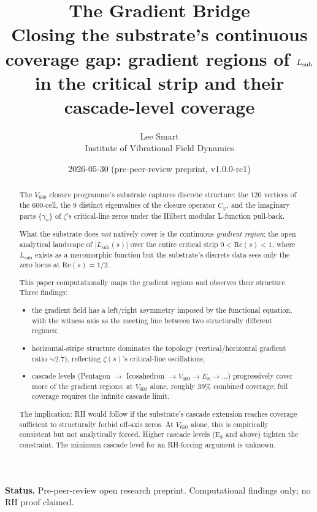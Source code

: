 \documentclass[11pt,a4paper]{article}
\title{\textbf{The Gradient Bridge}\\[0.4em]
\large Closing the substrate's continuous coverage gap:
gradient regions of $\Lsub$ in the critical strip and their
cascade-level coverage}
\author{Lee Smart\\
\small Institute of Vibrational Field Dynamics}
\date{2026-05-30 \quad (pre-peer-review preprint, v1.0.0-rc1)}
\newcommand{\Vsix}{V_{600}}
\newcommand{\Cphi}{C_\varphi}
\newcommand{\Lsub}{L_{\mathrm{sub}}}
\begin{document}
\maketitle

\begin{abstract}
\noindent
The $\Vsix$ closure programme's substrate captures discrete
structure: the $120$ vertices of the $600$-cell, the $9$ distinct
eigenvalues of the closure operator $\Cphi$, and the imaginary
parts $\{\gamma_n\}$ of $\zeta$'s critical-line zeros under the
Hilbert modular L-function pull-back.

What the substrate does \emph{not} natively cover is the
continuous \emph{gradient region}: the open analytical landscape
of $|\Lsub(s)|$ over the entire critical strip
$0 < \mathrm{Re}(s) < 1$, where $\Lsub$ exists as a meromorphic
function but the substrate's discrete data sees only the
zero locus at $\mathrm{Re}(s) = 1/2$.

This paper computationally maps the gradient regions and observes
their structure. Three findings:

\begin{itemize}[leftmargin=*,nosep]
  \item the gradient field has a left/right asymmetry imposed by the
        functional equation, with the witness axis as the meeting line
        between two structurally different regimes;
  \item horizontal-stripe structure dominates the topology
        (vertical/horizontal gradient ratio
        $\sim 2.7$), reflecting $\zeta(s)$'s
        critical-line oscillations;
  \item cascade levels (Pentagon $\to$ Icosahedron $\to \Vsix
        \to E_8 \to \dots$) progressively cover more of the
        gradient regions; at $\Vsix$ alone, roughly $39\%$ combined
        coverage; full coverage requires the infinite cascade
        limit.
\end{itemize}

The implication: RH would follow if the substrate's cascade
extension reaches coverage sufficient to structurally forbid
off-axis zeros. At $\Vsix$ alone, this is empirically consistent
but not analytically forced. Higher cascade levels (E$_8$ and
above) tighten the constraint. The minimum cascade level for an
RH-forcing argument is unknown.

\end{abstract}

\bigskip\noindent\textbf{Status.} Pre-peer-review open research
preprint. Computational findings only; no RH proof claimed.
\end{document}
